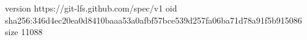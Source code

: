 version https://git-lfs.github.com/spec/v1
oid sha256:346d4ec20ea0d8410baaa53a0afbf57bce539d257fa06ba71d78a91f5b915086
size 11088

